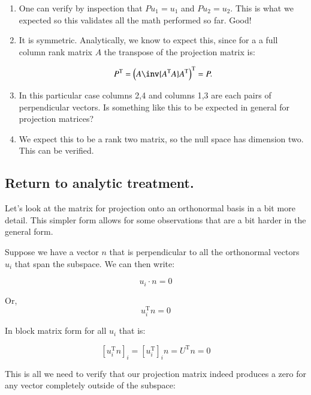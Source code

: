 \documentclass{article}      %
\newcommand{\T}[0]{{\text{T}}}
\begin{document}
\begin{enumerate}
\item
One can verify by inspection that $P u_1 = u_1$ and $P u_2 = u_2$.  This is what we expected
so this validates all the math performed so far.  Good!


\item
It is symmetric.  Analytically, we know to expect this, since for a 
a full column rank matrix $A$ the transpose of the projection matrix is:

\[
P^\T = {\left(A \inv{A^\T A} A^\T \right)}^\T = P.
\]

\item
In this particular case columns 2,4 and columns 1,3 are each pairs of
perpendicular vectors.  Is something like this to be expected in general for
projection matrices?

\item
We expect this to be a rank two matrix, so the null space has dimension two.  This can be verified.

\end{enumerate}

\subsection{ Return to analytic treatment. }

Let's look at the matrix for projection onto an orthonormal basis in a bit more detail.  This simpler form allows for
some observations that are a bit harder in the general form.

Suppose we have a vector $n$ that is perpendicular to all the orthonormal vectors $u_i$ that span the subspace.  We can then write:

\[
u_i \cdot n = 0
\]

Or,
\[
u_i^\T n = 0
\]

In block matrix form for all $u_i$ that is:

\[
[u_i^\T n]_i = [u_i^\T]_i n = U^\T n = 0
\]

This is all we need to verify that our projection matrix indeed produces a zero for any vector completely outside of the subspace:
\end{document}
